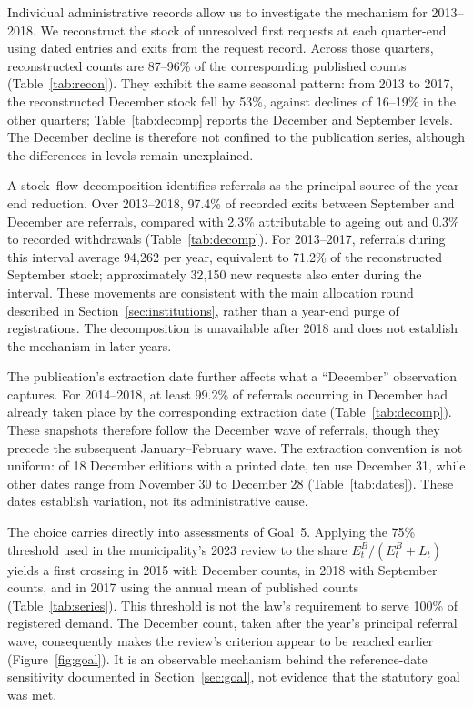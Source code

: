 Individual administrative records allow us to investigate the mechanism for 2013--2018. We reconstruct the stock of unresolved first requests at each quarter-end using dated entries and exits from the request record. Across those quarters, reconstructed counts are 87--96\% of the corresponding published counts (Table~\ref{tab:recon}). They exhibit the same seasonal pattern: from 2013 to 2017, the reconstructed December stock fell by 53\%, against declines of 16--19\% in the other quarters; Table~\ref{tab:decomp} reports the December and September levels. The December decline is therefore not confined to the publication series, although the differences in levels remain unexplained.

A stock--flow decomposition identifies referrals as the principal source of the year-end reduction. Over 2013--2018, 97.4\% of recorded exits between September and December are referrals, compared with 2.3\% attributable to ageing out and 0.3\% to recorded withdrawals (Table~\ref{tab:decomp}). For 2013--2017, referrals during this interval average 94,262 per year, equivalent to 71.2\% of the reconstructed September stock; approximately 32,150 new requests also enter during the interval. These movements are consistent with the main allocation round described in Section~\ref{sec:institutions}, rather than a year-end purge of registrations. The decomposition is unavailable after 2018 and does not establish the mechanism in later years.

The publication's extraction date further affects what a ``December'' observation captures. For 2014--2018, at least 99.2\% of referrals occurring in December had already taken place by the corresponding extraction date (Table~\ref{tab:decomp}). These snapshots therefore follow the December wave of referrals, though they precede the subsequent January--February wave. The extraction convention is not uniform: of 18 December editions with a printed date, ten use December 31, while other dates range from November 30 to December 28 (Table~\ref{tab:dates}). These dates establish variation, not its administrative cause.

The choice carries directly into assessments of Goal~5. Applying the 75\% threshold used in the municipality's 2023 review to the share $E^B_t/(E^B_t+L_t)$ yields a first crossing in 2015 with December counts, in 2018 with September counts, and in 2017 using the annual mean of published counts (Table~\ref{tab:series}). This threshold is not the law's requirement to serve 100\% of registered demand. The December count, taken after the year's principal referral wave, consequently makes the review's criterion appear to be reached earlier (Figure~\ref{fig:goal}). It is an observable mechanism behind the reference-date sensitivity documented in Section~\ref{sec:goal}, not evidence that the statutory goal was met.
